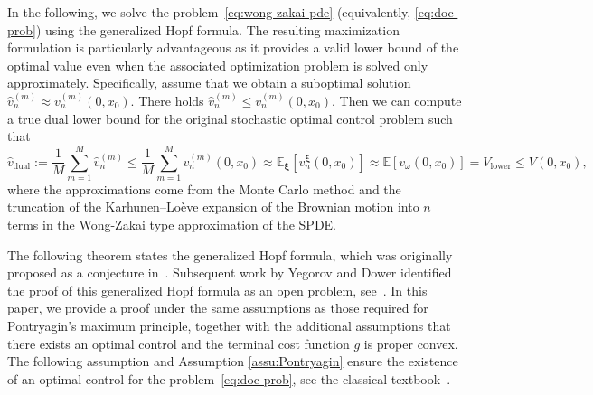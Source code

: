 \documentclass[11pt]{article}
\numberwithin{equation}{section}
\theoremstyle{plain}
\theoremstyle{definition}
\theoremstyle{remark}
\begin{document}
In the following, we solve the problem~\eqref{eq:wong-zakai-pde} (equivalently, \eqref{eq:doc-prob}) using the generalized Hopf formula. The resulting maximization formulation is particularly advantageous as it provides a valid lower bound of the optimal value even when the associated optimization problem is solved only approximately. Specifically, assume that we obtain a suboptimal solution $\hat{v}_n^{(m)} \approx v_n^{(m)}(0,x_0)$. There holds $\hat{v}_n^{(m)} \le v_n^{(m)}(0,x_0)$. Then we can compute a true dual lower bound for the original stochastic optimal control problem such that 
\begin{equation*}
    \hat{v}_{\text{dual}} :=\frac{1}{M}\sum_{m=1}^M \hat{v}_n^{(m)} \le \frac{1}{M}\sum_{m=1}^M v_n^{(m)}(0,x_0) \approx \mathbb{E}_{\bm{\xi}}[v_n^{\bm{\xi}}(0,x_0)] \approx \mathbb{E}[v_\omega(0, x_0)] = V_{\text{lower}} \le V(0, x_0),  
\end{equation*}
where the approximations come from the Monte Carlo method and the truncation of the Karhunen–Lo\`{e}ve expansion of the Brownian motion into $n$ terms in the Wong-Zakai type approximation of the SPDE.

The following theorem states the generalized Hopf formula, which was originally proposed as a conjecture in~\cite[eq. (1.2)]{chow2019algorithm}. Subsequent work by Yegorov and Dower identified the proof of this generalized Hopf formula as an open problem, see~\cite[Section 6]{yegorov2021perspectives}. In this paper, we provide a proof under the same assumptions as those required for Pontryagin’s maximum principle, together with the additional assumptions that there exists an optimal control and the terminal cost function $g$ is proper convex. The following assumption and Assumption \ref{assu:Pontryagin} ensure the existence of an optimal control for the problem~\eqref{eq:doc-prob}, see the classical textbook~\cite[Theorem 4.1, Chapter 3]{fleming2012deterministic}. 
\end{document}
